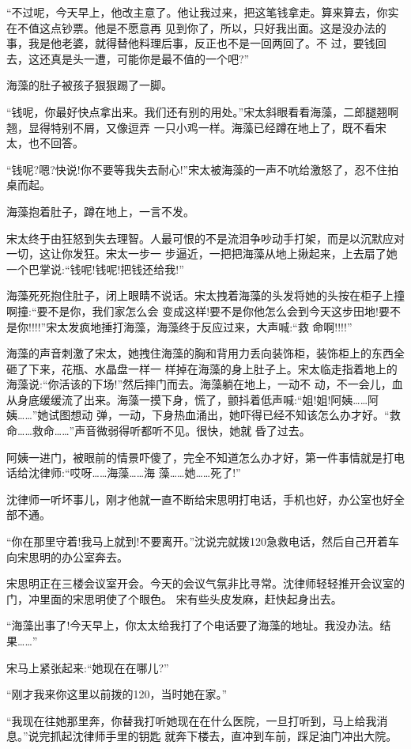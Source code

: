 \documentclass[11pt,a4paper,onecolumn]{article}
\begin{document}
``不过呢，今天早上，他改主意了。他让我过来，把这笔钱拿走。算来算去，你实在不值这点钞票。他是不愿意再
见到你了，所以，只好我出面。这是没办法的事，我是他老婆，就得替他料理后事，反正也不是一回两回了。不
过，要钱回去，这还真是头一遭，可能你是最不值的一个吧?''

海藻的肚子被孩子狠狠踢了一脚。

``钱呢，你最好快点拿出来。我们还有别的用处。''宋太斜眼看看海藻，二郎腿翘啊翘，显得特别不屑，又像逗弄
一只小鸡一样。海藻已经蹲在地上了，既不看宋太，也不回答。

``钱呢?嗯?快说!你不要等我失去耐心!''宋太被海藻的一声不吭给激怒了，忍不住拍桌而起。

海藻抱着肚子，蹲在地上，一言不发。

宋太终于由狂怒到失去理智。人最可恨的不是流泪争吵动手打架，而是以沉默应对一切，这让你发狂。宋太一步一
步逼近，一把把海藻从地上揪起来，上去扇了她一个巴掌说:``钱呢!钱呢!把钱还给我!''

海藻死死抱住肚子，闭上眼睛不说话。宋太拽着海藻的头发将她的头按在柜子上撞啊撞:``要不是你，我们家怎么会
变成这样!要不是你他怎么会到今天这步田地!要不是你!!!!''宋太发疯地捶打海藻，海藻终于反应过来，大声喊:``救
命啊!!!!''

海藻的声音刺激了宋太，她拽住海藻的胸和背用力丢向装饰柜，装饰柜上的东西全砸了下来，花瓶、水晶盘一样一
样掉在海藻的身上肚子上。宋太临走指着地上的海藻说:``你活该的下场!''然后摔门而去。海藻躺在地上，一动不
动，不一会儿，血从身底缓缓流了出来。海藻一摸下身，慌了，颤抖着低声喊:``姐!姐!阿姨……阿姨……''她试图想动
弹，一动，下身热血涌出，她吓得已经不知该怎么办才好。``救命……救命……''声音微弱得听都听不见。很快，她就
昏了过去。

阿姨一进门，被眼前的情景吓傻了，完全不知道怎么办才好，第一件事情就是打电话给沈律师:``哎呀……海藻……海
藻……她……死了!''

沈律师一听坏事儿，刚才他就一直不断给宋思明打电话，手机也好，办公室也好全部不通。

``你在那里守着!我马上就到!不要离开。''沈说完就拨120急救电话，然后自己开着车向宋思明的办公室奔去。

宋思明正在三楼会议室开会。今天的会议气氛非比寻常。沈律师轻轻推开会议室的门，冲里面的宋思明使了个眼色。
宋有些头皮发麻，赶快起身出去。

``海藻出事了!今天早上，你太太给我打了个电话要了海藻的地址。我没办法。结果……''

宋马上紧张起来:``她现在在哪儿?''

``刚才我来你这里以前拨的120，当时她在家。''

``我现在往她那里奔，你替我打听她现在在什么医院，一旦打听到，马上给我消息。''说完抓起沈律师手里的钥匙
就奔下楼去，直冲到车前，踩足油门冲出大院。
\end{document}
